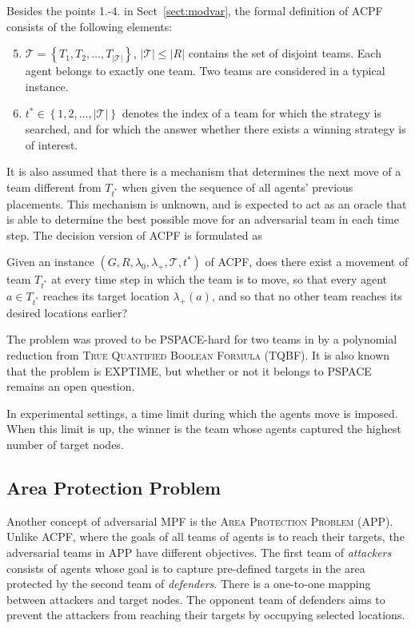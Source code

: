 Besides the points 1.-4. in Sect~\ref{sect:modvar}, the formal definition of ACPF consists of the following elements:
\begin{enumerate}
		\setcounter{enumi}{4}
	\item $\mathcal{T}=\left\{T_1,T_2,\dots,T_{|\mathcal{T}|}\right\}$, $|\mathcal{T}|\leq|R|$ contains the set of disjoint teams.
		Each agent belongs to exactly one team. 
		Two teams are considered in a typical instance. 
	\item $t^*\in\left\{1,2,\dots,|\mathcal{T}|\right\}$ denotes the index of a team for which the strategy is searched, 
		and for which the answer whether there exists a winning strategy is of interest.
\end{enumerate}
It is also assumed that there is a mechanism that determines the next move of a team different from $T_{t^*}$ when given the sequence of all agents' previous placements. 
This mechanism is unknown, and is expected to act as an oracle that is able to determine the best possible move for an adversarial team in each time step.
The decision version of ACPF is formulated as
\begin{problem}
Given an instance $(G,R,\lambda_0,\lambda_+,\mathcal{T},t^*)$ of ACPF, does there exist a movement of team $T_{t^*}$ at every time step in which the team is to move, 
so that every agent $a\in T_{t^*}$ reaches its target location $\lambda_+(a)$, and so that no other team reaches its desired locations earlier?
\end{problem}

The problem was proved to be PSPACE-hard for two teams in \cite{ivanova14} by a polynomial reduction from \textsc{True Quantified Boolean Formula} (TQBF).
It is also known that the problem is EXPTIME, but whether or not it belongs to PSPACE remains an open question.

In experimental settings, a time limit during which the agents move is imposed.
When this limit is up, the winner is the team whose agents captured the highest number of target nodes.

\subsection{Area Protection Problem}

Another concept of adversarial MPF is the \textsc{Area Protection Problem} (APP).
Unlike ACPF, where the goals of all teams of agents is to reach their targets, the adversarial teams in APP have different objectives. 
The first team of \emph{attackers} consists of agents whose goal is to capture pre-defined targets in the area protected by the second team of \emph{defenders}. 
There is a one-to-one mapping between attackers and target nodes.
The opponent team of defenders aims to prevent the attackers from reaching their targets by occupying selected locations.

